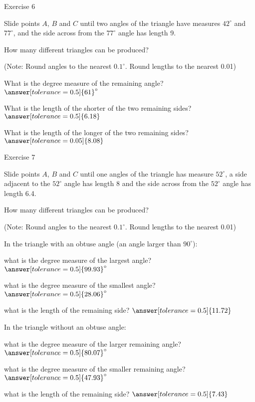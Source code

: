 \documentclass[number]{ximera}
\begin{document}
Exercise 6

Slide points $A$, $B$ and $C$ until two angles of the triangle have measures $42^\circ$ and $77^\circ$, and the side across from the $77^\circ$ angle has length 9.

\begin{question}
How many different triangles can be produced?
\begin{multipleChoice}
\end{multipleChoice}
\begin{question}
(Note: Round angles to the nearest $0.1^\circ$. Round lengths to the nearest 0.01)

What is the degree measure of the remaining angle? $\answer[tolerance=0.5]{61}^\circ$

What is the length of the shorter of the two remaining sides? $\answer[tolerance=0.5]{6.18}$

What is the length of the longer of the two remaining sides? $\answer[tolerance=0.05]{8.08}$
\end{question}
\end{question}

Exercise 7

Slide points $A$, $B$ and $C$ until one angles of the triangle has measure $52^\circ$, a side adjacent to the $52^\circ$ angle has length 8 and the side across from the $52^\circ$ angle has length 6.4.

\begin{question}
How many different triangles can be produced?
\begin{multipleChoice}
\end{multipleChoice}
\begin{question}
(Note: Round angles to the nearest $0.1^\circ$. Round lengths to the nearest 0.01)

In the triangle with an obtuse angle (an angle larger than $90^\circ$): 

what is the degree measure of the largest angle? $\answer[tolerance=0.5]{99.93}^\circ$

what is the degree measure of the smallest angle? $\answer[tolerance=0.5]{28.06}^\circ$

what is the length of the remaining side? $\answer[tolerance=0.5]{11.72}$

In the triangle without an obtuse angle:

what is the degree measure of the larger remaining angle? $\answer[tolerance=0.5]{80.07}^\circ$

what is the degree measure of the smaller remaining angle? $\answer[tolerance=0.5]{47.93}^\circ$

what is the length of the remaining side? $\answer[tolerance=0.5]{7.43}$

\end{question}
\end{question}
\end{document}
